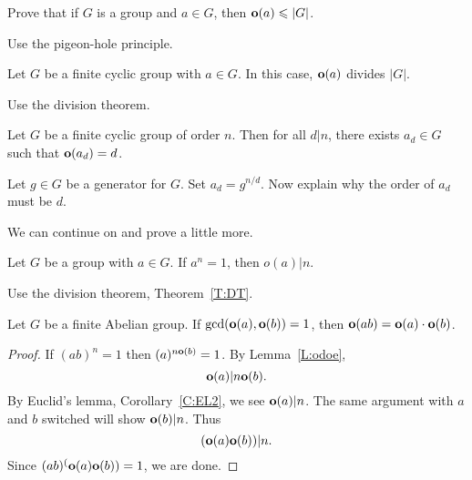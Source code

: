 \documentclass{ximera}
\begin{document}
\begin{lemma}
  Prove that if $G$ is a group and $a\in G$, then $\mathbf o(a)\leqslant |G|$.
  \begin{sketch}
    Use the pigeon-hole principle.
  \end{sketch}
\end{lemma}


\begin{theorem}\label{T:eodvgo}
  Let $G$ be a finite cyclic group with $a\in G$. In this case,
  $\mathbf o(a)$ divides $|G|$.
  \begin{sketch}
    Use the division theorem.
  \end{sketch}
\end{theorem}

\begin{corollary}
  Let $G$ be a finite cyclic group of order $n$. Then for all $d|n$,
  there exists $a_d\in G$ such that $\mathbf o(a_d) = d$.
  \begin{sketch}
    Let $g\in G$ be a generator for $G$. Set $a_d = g^{n/d}$. Now
    explain why the order of $a_d$ must be $d$.
  \end{sketch}
\end{corollary}

We can continue on and prove a little more.



\begin{lemma}\label{L:odoe}
  Let $G$ be a group with $a\in G$. If $a^n = 1$, then $o(a)|n$.
  \begin{sketch}
    Use the division theorem, Theorem~\ref{T:DT}.
  \end{sketch}
\end{lemma}


\begin{lemma}\label{L:cpeo}
  Let $G$ be a finite Abelian group. If $\gcd(\mathbf o(a),\mathbf o(b)) = 1$, then
  $\mathbf o(ab) = \mathbf o(a)\cdot \mathbf o(b)$.
  \begin{proof}
    If $(ab)^n = 1$ then $(a)^{n\mathbf o(b)} = 1$. By Lemma~\ref{L:odoe},
    \[
    \mathbf o(a) | n\mathbf o(b).
    \]
    By Euclid's lemma, Corollary~\ref{C:EL2}, we see $\mathbf o(a) | n$. The
    same argument with $a$ and $b$ switched will show $\mathbf o(b)|n$. Thus
    \[
    (\mathbf o(a)\mathbf o(b))|n.
    \]
    Since $(ab)^(\mathbf o(a)\mathbf o(b)) = 1$, we are done.
  \end{proof}
\end{lemma}
\end{document}
